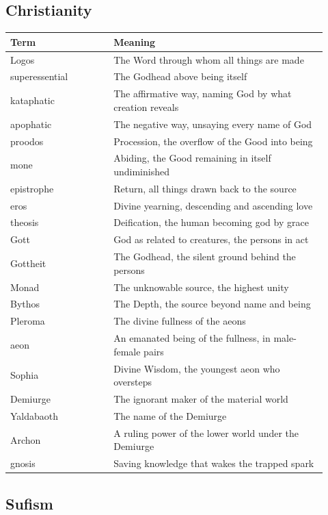 \subsection{Christianity}

\begin{longtable}{L{0.30\linewidth} L{0.62\linewidth}}
\toprule
\textbf{Term} & \textbf{Meaning} \\
\midrule
\endhead
Logos & The Word through whom all things are made \\
superessential & The Godhead above being itself \\
kataphatic & The affirmative way, naming God by what creation reveals \\
apophatic & The negative way, unsaying every name of God \\
proodos & Procession, the overflow of the Good into being \\
mone & Abiding, the Good remaining in itself undiminished \\
epistrophe & Return, all things drawn back to the source \\
eros & Divine yearning, descending and ascending love \\
theosis & Deification, the human becoming god by grace \\
Gott & God as related to creatures, the persons in act \\
Gottheit & The Godhead, the silent ground behind the persons \\
Monad & The unknowable source, the highest unity \\
Bythos & The Depth, the source beyond name and being \\
Pleroma & The divine fullness of the aeons \\
aeon & An emanated being of the fullness, in male-female pairs \\
Sophia & Divine Wisdom, the youngest aeon who oversteps \\
Demiurge & The ignorant maker of the material world \\
Yaldabaoth & The name of the Demiurge \\
Archon & A ruling power of the lower world under the Demiurge \\
gnosis & Saving knowledge that wakes the trapped spark \\
\bottomrule
\end{longtable}

\subsection{Sufism}

